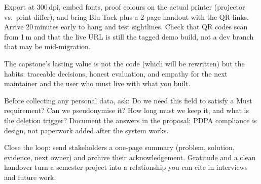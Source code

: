 \begin{remark}
Export at 300\,dpi, embed fonts, proof colours on the actual printer (projector vs.\ print differ), and bring Blu Tack plus a 2-page handout with the QR links. Arrive 20\,minutes early to hang and test sightlines. Check that QR codes scan from 1\,m and that the live URL is still the tagged demo build, not a dev branch that may be mid-migration.
\end{remark}

The capstone's lasting value is not the code (which will be rewritten) but the habits: traceable decisions, honest evaluation, and empathy for the next maintainer and the user who must live with what you built.

\begin{remark}
Before collecting any personal data, ask: Do we need this field to satisfy a Must requirement? Can we pseudonymise it? How long must we keep it, and what is the deletion trigger? Document the answers in the proposal; PDPA compliance is design, not paperwork added after the system works.
\end{remark}

\begin{remark}
Close the loop: send stakeholders a one-page summary (problem, solution, evidence, next owner) and archive their acknowledgement. Gratitude and a clean handover turn a semester project into a relationship you can cite in interviews and future work.
\end{remark}

